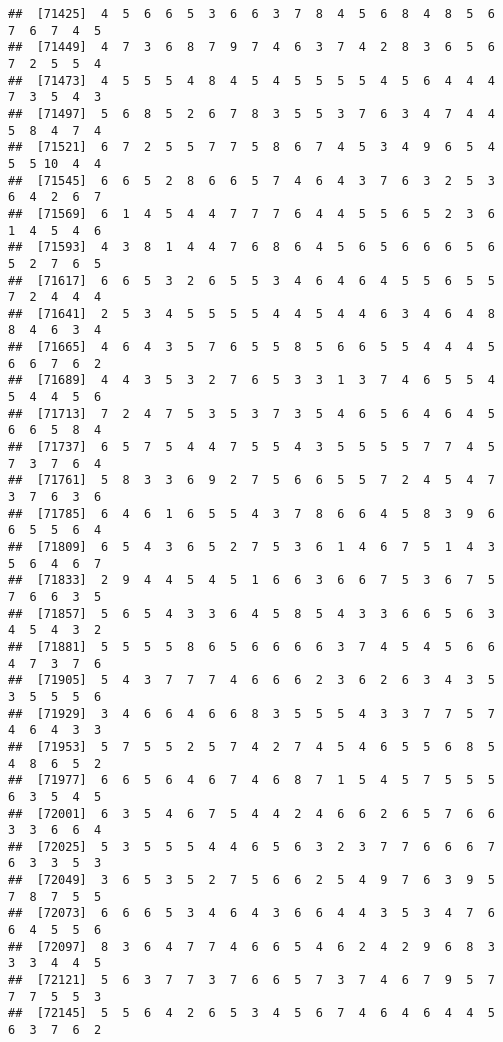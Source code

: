 \documentclass[
]{book}
\begin{document}
\begin{verbatim}
##  [71425]  4  5  6  6  5  3  6  6  3  7  8  4  5  6  8  4  8  5  6  7  6  7  4  5
##  [71449]  4  7  3  6  8  7  9  7  4  6  3  7  4  2  8  3  6  5  6  7  2  5  5  4
##  [71473]  4  5  5  5  4  8  4  5  4  5  5  5  5  4  5  6  4  4  4  7  3  5  4  3
##  [71497]  5  6  8  5  2  6  7  8  3  5  5  3  7  6  3  4  7  4  4  5  8  4  7  4
##  [71521]  6  7  2  5  5  7  7  5  8  6  7  4  5  3  4  9  6  5  4  5  5 10  4  4
##  [71545]  6  6  5  2  8  6  6  5  7  4  6  4  3  7  6  3  2  5  3  6  4  2  6  7
##  [71569]  6  1  4  5  4  4  7  7  7  6  4  4  5  5  6  5  2  3  6  1  4  5  4  6
##  [71593]  4  3  8  1  4  4  7  6  8  6  4  5  6  5  6  6  6  5  6  5  2  7  6  5
##  [71617]  6  6  5  3  2  6  5  5  3  4  6  4  6  4  5  5  6  5  5  7  2  4  4  4
##  [71641]  2  5  3  4  5  5  5  5  4  4  5  4  4  6  3  4  6  4  8  8  4  6  3  4
##  [71665]  4  6  4  3  5  7  6  5  5  8  5  6  6  5  5  4  4  4  5  6  6  7  6  2
##  [71689]  4  4  3  5  3  2  7  6  5  3  3  1  3  7  4  6  5  5  4  5  4  4  5  6
##  [71713]  7  2  4  7  5  3  5  3  7  3  5  4  6  5  6  4  6  4  5  6  6  5  8  4
##  [71737]  6  5  7  5  4  4  7  5  5  4  3  5  5  5  5  7  7  4  5  7  3  7  6  4
##  [71761]  5  8  3  3  6  9  2  7  5  6  6  5  5  7  2  4  5  4  7  3  7  6  3  6
##  [71785]  6  4  6  1  6  5  5  4  3  7  8  6  6  4  5  8  3  9  6  6  5  5  6  4
##  [71809]  6  5  4  3  6  5  2  7  5  3  6  1  4  6  7  5  1  4  3  5  6  4  6  7
##  [71833]  2  9  4  4  5  4  5  1  6  6  3  6  6  7  5  3  6  7  5  7  6  6  3  5
##  [71857]  5  6  5  4  3  3  6  4  5  8  5  4  3  3  6  6  5  6  3  4  5  4  3  2
##  [71881]  5  5  5  5  8  6  5  6  6  6  6  3  7  4  5  4  5  6  6  4  7  3  7  6
##  [71905]  5  4  3  7  7  7  4  6  6  6  2  3  6  2  6  3  4  3  5  3  5  5  5  6
##  [71929]  3  4  6  6  4  6  6  8  3  5  5  5  4  3  3  7  7  5  7  4  6  4  3  3
##  [71953]  5  7  5  5  2  5  7  4  2  7  4  5  4  6  5  5  6  8  5  4  8  6  5  2
##  [71977]  6  6  5  6  4  6  7  4  6  8  7  1  5  4  5  7  5  5  5  6  3  5  4  5
##  [72001]  6  3  5  4  6  7  5  4  4  2  4  6  6  2  6  5  7  6  6  3  3  6  6  4
##  [72025]  5  3  5  5  5  4  4  6  5  6  3  2  3  7  7  6  6  6  7  6  3  3  5  3
##  [72049]  3  6  5  3  5  2  7  5  6  6  2  5  4  9  7  6  3  9  5  7  8  7  5  5
##  [72073]  6  6  6  5  3  4  6  4  3  6  6  4  4  3  5  3  4  7  6  6  4  5  5  6
##  [72097]  8  3  6  4  7  7  4  6  6  5  4  6  2  4  2  9  6  8  3  3  3  4  4  5
##  [72121]  5  6  3  7  7  3  7  6  6  5  7  3  7  4  6  7  9  5  7  7  7  5  5  3
##  [72145]  5  5  6  4  2  6  5  3  4  5  6  7  4  6  4  6  4  4  5  6  3  7  6  2

\end{verbatim}
\end{document}
